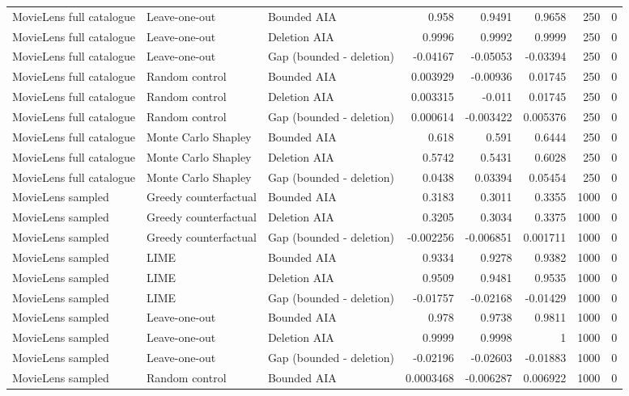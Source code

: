 \begin{table}[t]
{\begin{tabular}{lllrrrrr}
MovieLens full catalogue & Leave-one-out & Bounded AIA & 0.958 & 0.9491 & 0.9658 & 250 & 0 \\
MovieLens full catalogue & Leave-one-out & Deletion AIA & 0.9996 & 0.9992 & 0.9999 & 250 & 0 \\
MovieLens full catalogue & Leave-one-out & Gap (bounded - deletion) & -0.04167 & -0.05053 & -0.03394 & 250 & 0 \\
MovieLens full catalogue & Random control & Bounded AIA & 0.003929 & -0.00936 & 0.01745 & 250 & 0 \\
MovieLens full catalogue & Random control & Deletion AIA & 0.003315 & -0.011 & 0.01745 & 250 & 0 \\
MovieLens full catalogue & Random control & Gap (bounded - deletion) & 0.000614 & -0.003422 & 0.005376 & 250 & 0 \\
MovieLens full catalogue & Monte Carlo Shapley & Bounded AIA & 0.618 & 0.591 & 0.6444 & 250 & 0 \\
MovieLens full catalogue & Monte Carlo Shapley & Deletion AIA & 0.5742 & 0.5431 & 0.6028 & 250 & 0 \\
MovieLens full catalogue & Monte Carlo Shapley & Gap (bounded - deletion) & 0.0438 & 0.03394 & 0.05454 & 250 & 0 \\
MovieLens sampled & Greedy counterfactual & Bounded AIA & 0.3183 & 0.3011 & 0.3355 & 1000 & 0 \\
MovieLens sampled & Greedy counterfactual & Deletion AIA & 0.3205 & 0.3034 & 0.3375 & 1000 & 0 \\
MovieLens sampled & Greedy counterfactual & Gap (bounded - deletion) & -0.002256 & -0.006851 & 0.001711 & 1000 & 0 \\
MovieLens sampled & LIME & Bounded AIA & 0.9334 & 0.9278 & 0.9382 & 1000 & 0 \\
MovieLens sampled & LIME & Deletion AIA & 0.9509 & 0.9481 & 0.9535 & 1000 & 0 \\
MovieLens sampled & LIME & Gap (bounded - deletion) & -0.01757 & -0.02168 & -0.01429 & 1000 & 0 \\
MovieLens sampled & Leave-one-out & Bounded AIA & 0.978 & 0.9738 & 0.9811 & 1000 & 0 \\
MovieLens sampled & Leave-one-out & Deletion AIA & 0.9999 & 0.9998 & 1 & 1000 & 0 \\
MovieLens sampled & Leave-one-out & Gap (bounded - deletion) & -0.02196 & -0.02603 & -0.01883 & 1000 & 0 \\
MovieLens sampled & Random control & Bounded AIA & 0.0003468 & -0.006287 & 0.006922 & 1000 & 0 \\

\end{tabular}}
\end{table}
